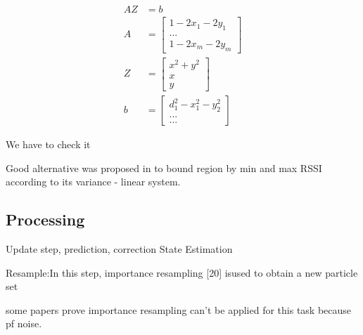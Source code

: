 \begin{align}
AZ & = b \\
A &= \begin{bmatrix} 
1 - 2 x_1 - 2 y_1 \\
... \\
1 - 2 x_m - 2 y_m
\end{bmatrix} \\
Z &= \begin{bmatrix} 
x^2 + y^2 \\
x \\
y
\end{bmatrix} \\
b &= \begin{bmatrix} 
d_1^2 - x_1^2 - y_2^2\\
...\\
...
\end{bmatrix}
\end{align}

We have to check it

Good alternative was proposed in \cite{} to bound region by min and max RSSI according to its variance - linear system.

\subsection{Processing}

Update step, prediction, correction
State Estimation


Resample:In  this  step,  importance  resampling  [20]  isused to obtain a new particle set

some papers prove importance resampling can't be applied for this task because pf noise.







